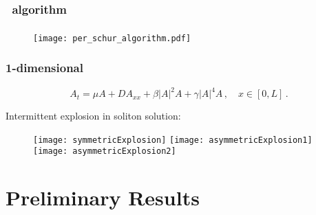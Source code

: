 \documentclass[mathserif, handout]{beamer}
\begin{document}
\begin{frame}
  \frametitle{  \cLv\ algorithm}

  

\end{frame}

\begin{frame}
  \frametitle{  \psd {}}
  \begin{figure}[h]
    \centering
    \texttt{[image: per\_schur\_algorithm.pdf]}
  \end{figure}

\end{frame}

\begin{frame}
  \frametitle{ \scriptsize{1-dimensional \cqcGLe{}} }

  \begin{equation}
    \label{eq:cqcgl1d}
    A_t = \mu A + DA_{xx} + \beta |A|^2A + \gamma |A|^4A \,,\quad x\in[0,L]
    \,.
  \end{equation}

  Intermittent explosion in soliton solution:
  \begin{figure}[h]
    \centering
    \texttt{[image: symmetricExplosion]}%
    \texttt{[image: asymmetricExplosion1]}%
    \texttt{[image: asymmetricExplosion2]}
    \label{fig:explosionTypes}
  \end{figure}

\end{frame}
\section{Preliminary Results}
\end{document}
